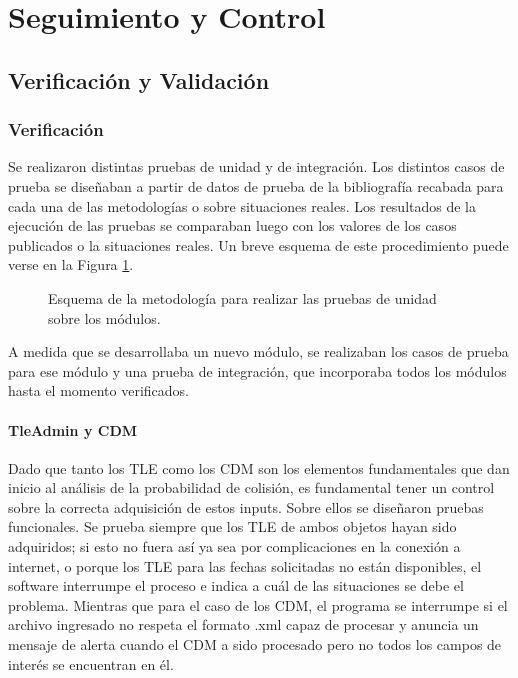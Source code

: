 \section{Seguimiento y Control}

\subsection{Verificaci\'on y Validaci\'on}\label{sec:vandv}

\subsubsection*{Verificaci\'on}
Se realizaron distintas pruebas de unidad y de integraci\'on.  
Los distintos casos de prueba se diseñaban a partir de datos de prueba de la bibliograf\'ia recabada para cada una de las metodolog\'ias o sobre situaciones reales. Los resultados de la ejecución de las pruebas se comparaban luego con los valores de los casos publicados o la situaciones reales. Un breve esquema de este procedimiento puede verse en la Figura \ref{fig:metodoprueba}. 

\begin{figure}[h!]
  \centering
  \caption{Esquema de la metodología para realizar las pruebas de unidad sobre los módulos.}
  \label{fig:metodoprueba}
\end{figure}

A medida que se desarrollaba un nuevo m\'odulo, se realizaban los casos de prueba para ese m\'odulo y una prueba de integraci\'on, que incorporaba todos los m\'odulos hasta el momento verificados.

\paragraph*{TleAdmin y CDM}
Dado que tanto los TLE como los CDM son los elementos fundamentales que dan inicio al an\'alisis de la probabilidad de colisi\'on, es fundamental tener un control sobre la correcta adquisici\'on de estos inputs. Sobre ellos se diseñaron pruebas funcionales. Se prueba siempre que los TLE de ambos objetos hayan sido adquiridos; si esto no fuera as\'i ya sea por complicaciones en la conexi\'on a internet, o porque los TLE para las fechas solicitadas no est\'an disponibles, el software interrumpe el proceso e indica a cu\'al de las situaciones se debe el problema. Mientras que para el caso de los CDM, el programa se interrumpe si el archivo ingresado no respeta el formato .xml capaz de procesar y anuncia un mensaje de alerta cuando el CDM a sido procesado pero no todos los campos de inter\'es se encuentran en \'el. 

